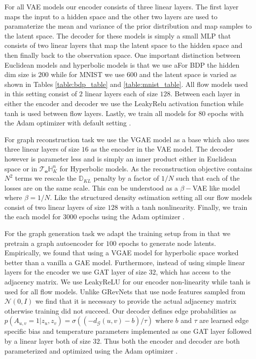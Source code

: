For all VAE models our encoder consists of three linear layers. The first layer maps the input to a hidden space and the other two layers are used to paramaterize the mean and variance of the prior distribution and map samples to the latent space. The decoder for these models is simply a small MLP that consists of two linear layers that map the latent space to the hidden space and then finally back to the observation space. One important distinction between Euclidean models and hyperbolic models is that we use aFor BDP the hidden dim size is $200$ while for MNIST we use $600$ and the latent space is varied as shown in Tables \ref{table:bdp_table} and \ref{table:mnist_table}. All flow models used in this setting consist of $2$ linear layers each of size $128$. Between each layer in either the encoder and decoder we use the LeakyRelu \cite{xu2015empirical} activation function while tanh is used between flow layers. Lastly, we train all models for $80$ epochs with the Adam optimizer with default setting \cite{kingma2014adam}.

For graph reconstruction task we use the VGAE model as a base \cite{kipf2016variational} which also uses three linear layers of size $16$ as the encoder in the VAE model. The decoder however is parameter less and is simply an inner product either in Euclidean space or in $\mathcal{T}_{\textbf{o}}\mathbb{H}^n_K$ for Hyperbolic models. As the reconstruction objective contains $N^2$ terms we rescale the $\mathbb{D}_{KL}$ penalty by a factor of $1/N$ such that each of the losses are on the same scale. This can be understood as a $\beta-$VAE like model where $\beta = 1/N$. Like the structured density estimation setting all our flow models consist of two linear layers of size $128$ with a tanh nonlinearity. Finally, we train the each model for $3000$ epochs using the Adam optimizer \cite{kingma2014adam}. 

For the graph generation task we adapt the training setup from \cite{liu2019graph} in that we pretrain a graph autoencoder for $100$ epochs to generate node latents. Empirically, we found that using a VGAE model for hyperbolic space worked better than a vanilla a GAE model. Furthermore, instead of using simple linear layers for the encoder we use GAT \cite{velivckovic2017graph} layer of size $32$, which has access to the adjacency matrix. We use LeakyReLU for our encoder non-linearity while tanh is used for all flow models. Unlike GRevNets that use node features sampled from $\mathcal{N}(0,I)$ we find that it is necessary to provide the actual adjacency matrix otherwise training did not succeed. Our decoder defines edge probabilities as $p(A_{u,v}=1|z_u,z_v) = \sigma((-d_{\mathcal{G}}(u,v) - b)/\tau)$ where $b$ and $\tau$ are learned edge specific bias and temperature parameters implemented as one GAT layer followed by a linear layer both of size $32$. Thus both the encoder and decoder are both parameterized and optimized using the Adam optimizer \cite{kingma2014adam}. 


